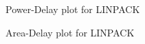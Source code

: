 \documentclass[a4paper, twoside]{article}      %
\begin{document}
\begin{figure}[h!]
{\centering {} \par}
\caption{Power-Delay plot for LINPACK}
\end{figure}

\begin{figure}[h!]
{\centering {} \par}
\caption{Area-Delay plot for LINPACK}
\end{figure}
\end{document}
